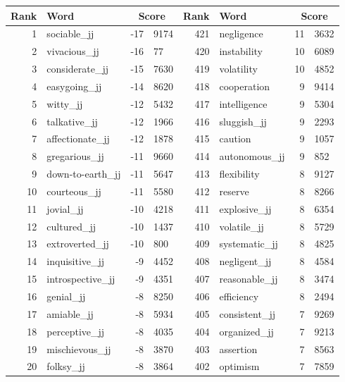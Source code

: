 \begin{table}[tbp]
    \begin{tabular}{| rlr@{.}l | rlr@{.}l |}
    \hline
    \textbf{Rank} & \textbf{Word} & \multicolumn{2}{c|}{\textbf{Score}} & \textbf{Rank} & \textbf{Word} & \multicolumn{2}{c|}{\textbf{Score}} \\
    \hline
    1 & sociable\_jj & -17 & 9174    &    421 & negligence & 11 & 3632 \\
    2 & vivacious\_jj & -16 & 77    &    420 & instability & 10 & 6089 \\
    3 & considerate\_jj & -15 & 7630    &    419 & volatility & 10 & 4852 \\
    4 & easygoing\_jj & -14 & 8620    &    418 & cooperation & 9 & 9414 \\
    5 & witty\_jj & -12 & 5432    &    417 & intelligence & 9 & 5304 \\
    6 & talkative\_jj & -12 & 1966    &    416 & sluggish\_jj & 9 & 2293 \\
    7 & affectionate\_jj & -12 & 1878    &    415 & caution & 9 & 1057 \\
    8 & gregarious\_jj & -11 & 9660    &    414 & autonomous\_jj & 9 & 852 \\
    9 & down-to-earth\_jj & -11 & 5647    &    413 & flexibility & 8 & 9127 \\
    10 & courteous\_jj & -11 & 5580    &    412 & reserve & 8 & 8266 \\
    11 & jovial\_jj & -10 & 4218    &    411 & explosive\_jj & 8 & 6354 \\
    12 & cultured\_jj & -10 & 1437    &    410 & volatile\_jj & 8 & 5729 \\
    13 & extroverted\_jj & -10 & 800    &    409 & systematic\_jj & 8 & 4825 \\
    14 & inquisitive\_jj & -9 & 4452    &    408 & negligent\_jj & 8 & 4584 \\
    15 & introspective\_jj & -9 & 4351    &    407 & reasonable\_jj & 8 & 3474 \\
    16 & genial\_jj & -8 & 8250    &    406 & efficiency & 8 & 2494 \\
    17 & amiable\_jj & -8 & 5934    &    405 & consistent\_jj & 7 & 9269 \\
    18 & perceptive\_jj & -8 & 4035    &    404 & organized\_jj & 7 & 9213 \\
    19 & mischievous\_jj & -8 & 3870    &    403 & assertion & 7 & 8563 \\
    20 & folksy\_jj & -8 & 3864    &    402 & optimism & 7 & 7859 \\

\end{tabular}
\end{table}
